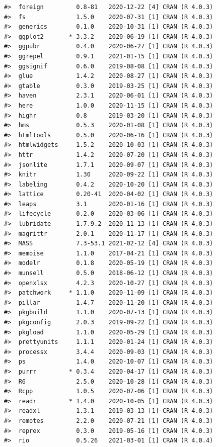 \documentclass[
]{article}
\begin{document}
\begin{verbatim}
#>  foreign         0.8-81   2020-12-22 [4] CRAN (R 4.0.3)
#>  fs              1.5.0    2020-07-31 [1] CRAN (R 4.0.3)
#>  generics        0.1.0    2020-10-31 [1] CRAN (R 4.0.3)
#>  ggplot2       * 3.3.2    2020-06-19 [1] CRAN (R 4.0.3)
#>  ggpubr          0.4.0    2020-06-27 [1] CRAN (R 4.0.3)
#>  ggrepel         0.9.1    2021-01-15 [1] CRAN (R 4.0.3)
#>  ggsignif        0.6.0    2019-08-08 [1] CRAN (R 4.0.3)
#>  glue            1.4.2    2020-08-27 [1] CRAN (R 4.0.3)
#>  gtable          0.3.0    2019-03-25 [1] CRAN (R 4.0.3)
#>  haven           2.3.1    2020-06-01 [1] CRAN (R 4.0.3)
#>  here            1.0.0    2020-11-15 [1] CRAN (R 4.0.3)
#>  highr           0.8      2019-03-20 [1] CRAN (R 4.0.3)
#>  hms             0.5.3    2020-01-08 [1] CRAN (R 4.0.3)
#>  htmltools       0.5.0    2020-06-16 [1] CRAN (R 4.0.3)
#>  htmlwidgets     1.5.2    2020-10-03 [1] CRAN (R 4.0.3)
#>  httr            1.4.2    2020-07-20 [1] CRAN (R 4.0.3)
#>  jsonlite        1.7.1    2020-09-07 [1] CRAN (R 4.0.3)
#>  knitr           1.30     2020-09-22 [1] CRAN (R 4.0.3)
#>  labeling        0.4.2    2020-10-20 [1] CRAN (R 4.0.3)
#>  lattice         0.20-41  2020-04-02 [1] CRAN (R 4.0.3)
#>  leaps           3.1      2020-01-16 [1] CRAN (R 4.0.3)
#>  lifecycle       0.2.0    2020-03-06 [1] CRAN (R 4.0.3)
#>  lubridate       1.7.9.2  2020-11-13 [1] CRAN (R 4.0.3)
#>  magrittr        2.0.1    2020-11-17 [1] CRAN (R 4.0.3)
#>  MASS            7.3-53.1 2021-02-12 [4] CRAN (R 4.0.3)
#>  memoise         1.1.0    2017-04-21 [1] CRAN (R 4.0.3)
#>  modelr          0.1.8    2020-05-19 [1] CRAN (R 4.0.3)
#>  munsell         0.5.0    2018-06-12 [1] CRAN (R 4.0.3)
#>  openxlsx        4.2.3    2020-10-27 [1] CRAN (R 4.0.3)
#>  patchwork     * 1.1.0    2020-11-09 [1] CRAN (R 4.0.3)
#>  pillar          1.4.7    2020-11-20 [1] CRAN (R 4.0.3)
#>  pkgbuild        1.1.0    2020-07-13 [1] CRAN (R 4.0.3)
#>  pkgconfig       2.0.3    2019-09-22 [1] CRAN (R 4.0.3)
#>  pkgload         1.1.0    2020-05-29 [1] CRAN (R 4.0.3)
#>  prettyunits     1.1.1    2020-01-24 [1] CRAN (R 4.0.3)
#>  processx        3.4.4    2020-09-03 [1] CRAN (R 4.0.3)
#>  ps              1.4.0    2020-10-07 [1] CRAN (R 4.0.3)
#>  purrr         * 0.3.4    2020-04-17 [1] CRAN (R 4.0.3)
#>  R6              2.5.0    2020-10-28 [1] CRAN (R 4.0.3)
#>  Rcpp            1.0.5    2020-07-06 [1] CRAN (R 4.0.3)
#>  readr         * 1.4.0    2020-10-05 [1] CRAN (R 4.0.3)
#>  readxl          1.3.1    2019-03-13 [1] CRAN (R 4.0.3)
#>  remotes         2.2.0    2020-07-21 [1] CRAN (R 4.0.3)
#>  reprex          0.3.0    2019-05-16 [1] CRAN (R 4.0.3)
#>  rio             0.5.26   2021-03-01 [1] CRAN (R 4.0.4)

\end{verbatim}
\end{document}

